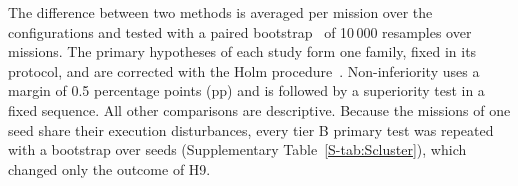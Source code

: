 The difference between two methods is averaged per mission over the configurations and tested with a paired
bootstrap~\cite{efron1993bootstrap} of 10\,000 resamples over missions. The primary hypotheses of each study form one
family, fixed in its protocol, and are corrected with the Holm procedure~\cite{holm1979simple}. Non-inferiority uses a margin of 0.5 percentage points (pp) and is followed by a
superiority test in a fixed sequence. All other comparisons are descriptive. Because the missions of one seed share
their execution disturbances, every tier B primary test was repeated with a bootstrap over seeds (Supplementary
Table~\ref{S-tab:Scluster}), which changed only the outcome of H9.
